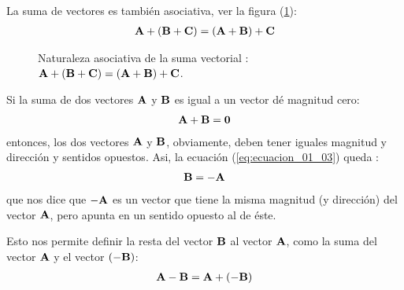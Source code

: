 La suma de vectores es también asociativa, ver la figura (\ref{fig:figura_01_04}):
\begin{align*}
    \vb{A} + \left( \vb{B} + \vb{C} \right) = \left( \vb{A} + \vb{B} \right) + \vb{C}
\end{align*}
\begin{figure}[H]
    \centering
    \caption{Naturaleza asociativa de la suma vectorial : $\vb{A} + \left( \vb{B} + \vb{C} \right) = \left( \vb{A} + \vb{B} \right) + \vb{C}$.}
    \label{fig:figura_01_04}
\end{figure}
Si la suma de dos vectores $\vb{A}$ y $\vb{B}$ es igual a un vector dé magnitud cero:
\begin{align}
    \vb{A} + \vb{B} = \vb{0}
    \label{eq:ecuacion_01_03}
\end{align}
entonces, los dos vectores $\vb{A}$ y $\vb{B}$, obviamente, deben tener iguales magnitud y dirección y sentidos opuestos. Asi, la ecuación (\ref{eq:ecuacion_01_03}) queda :
\begin{align}
    \vb{B} = - \vb{A}
    \label{ec:ecuacion_01_04}
\end{align}
que nos dice que $- \vb{A}$ es un vector que tiene la misma magnitud (y dirección) del vector $\vb{A}$, pero apunta en un sentido opuesto al de éste. 
\par
Esto nos permite definir la resta del vector $\vb{B}$ al vector $\vb{A}$, como la suma del vector $\vb{A}$ y el vector $\left( - \vb{B} \right)$: 
\begin{align}
    \vb{A} - \vb{B} = \vb{A} + \left( - \vb{B} \right)
    \label{eq:ecuacion_01_05}
\end{align}

